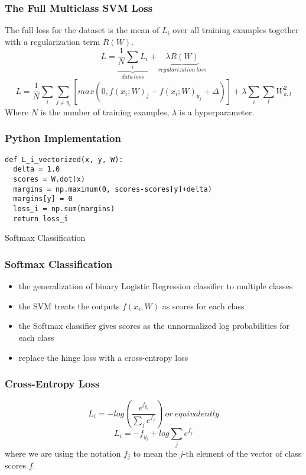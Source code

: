 \documentclass[14 pt]{beamer}
\let\olditem\item
\renewcommand{\item}{\olditem\vspace{4pt}}
\begin{document}
 \begin{frame}[fragile]
   \frametitle{ The Full Multiclass SVM Loss }
   The full loss for the dataset is the mean of $L_i$ over all training
   examples together with a regularization term $R(W)$.
   \begin{displaymath}
     L = \underbrace{\frac{1}{N}\sum_i L_i}_{data \ loss} +
     \underbrace{\lambda R(W)}_{regularization \ loss}
   \end{displaymath}
\small{
   \begin{displaymath}
     L   =   \frac{1}{N}\sum_i\sum_{j\neq y_i}[max(0, f(x_i;W)_j - f(x_i;
     W)_{y_j}+\Delta)]   +      \lambda \sum_i\sum_lW_{k,l}^2
   \end{displaymath}
}
Where $N$ is the number of training examples, $\lambda$ is a hyperparameter.
 \end{frame}

  \begin{frame}[fragile]
    \frametitle{Python Implementation}
\small{
    \begin{block}{}
 \begin{verbatim}
def L_i_vectorized(x, y, W):
  delta = 1.0
  scores = W.dot(x)
  margins = np.maximum(0, scores-scores[y]+delta)
  margins[y] = 0
  loss_i = np.sum(margins)
  return loss_i
 \end{verbatim}
    \end{block}
}
  \end{frame}

\begin{frame}
\begin{center}
\Large{Softmax Classification}
\end{center}
\end{frame}

\begin{frame}
  \frametitle{Softmax Classification}
  \begin{itemize}
  \item the generalization of binary Logistic
   Regression classifier to multiple classes
 \item  the SVM  treats the outputs $f(x_i,W)$ as  scores for each class
 \item  the Softmax classifier gives  scores as the unnormalized log
   probabilities for each class
 \item  replace the hinge loss with a cross-entropy loss
 \end{itemize}
\end{frame}

\begin{frame}
  \frametitle{Cross-Entropy Loss}
  \begin{displaymath}
    L_i = -log(\frac{e^{f_{y_i}}}{\sum_je^{f_j}}) \ or \ equivalently
  \end{displaymath}
  \begin{displaymath}
    L_i = -f_{y_i}+ log\sum_je^{f_j}
  \end{displaymath}
where we are using the notation $f_j$ to mean the $j$-th element of the vector of class scores $f$.
\end{frame}
\end{document}
